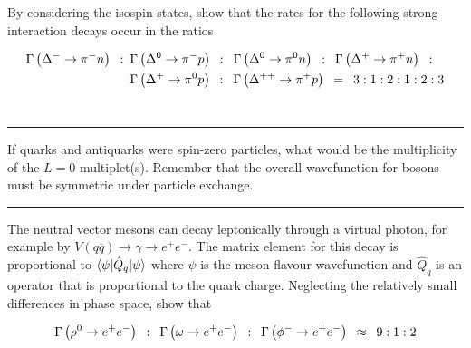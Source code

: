 \begin{problem}{9.3}
By considering the isospin states, show that the rates for the following strong interaction decays occur in the ratios

\begin{align*}
    \Gamma \left( \Delta^- \to \pi^- n \right) \hskip0.5em\relax : \hskip0.5em\relax   &\Gamma \left( \Delta^0 \to \pi^- p \right) \hskip0.5em\relax  : \hskip0.5em\relax   \Gamma \left( \Delta^0 \to \pi^0 n \right) \hskip0.5em\relax : \hskip0.5em\relax   \Gamma \left( \Delta^+ \to \pi^+ n \right) \hskip0.5em\relax : \\
    &\Gamma \left( \Delta^+ \to \pi^0 p \right) \hskip0.5em\relax : \hskip0.5em\relax    \Gamma \left( \Delta^{++} \to \pi^+ p \right) \hskip0.5em\relax =  \hskip0.5em\relax 3:1:2:1:2:3
\end{align*}\\
\end{problem}
\begin{solution}

\end{solution}

\noindent\rule{7in}{1.5pt}


\begin{problem}{9.4}
If quarks and antiquarks were spin-zero particles, what would be the multiplicity of the $L = 0$ multiplet(s). Remember that the overall wavefunction for bosons must be symmetric under particle exchange.
\end{problem}
\begin{solution}

\end{solution}

\noindent\rule{7in}{1.5pt}


\begin{problem}{9.5}
The neutral vector mesons can decay leptonically through a virtual photon, for example by $V(q\overbar{q}) \to \gamma \to e^+e^-$. The matrix element for this decay is proportional to $\braket{\psi|\hat{Q}_q|\psi}$ where $\psi$ is the meson flavour wavefunction and $\hat{Q}_q$ is an operator that is proportional to the quark charge. Neglecting the relatively small differences in phase space, show that

\begin{align*}
    \Gamma \left( \rho^0 \to e^+e^- \right) \hskip0.5em\relax  : \hskip0.5em\relax   \Gamma \left( \omega \to  e^+e^- \right) \hskip0.5em\relax : \hskip0.5em\relax   \Gamma \left( \phi^- \to e^+e^- \right) \hskip0.5em\relax \approx \hskip0.5em\relax 9:1:2
\end{align*}\\
\end{problem}
\begin{solution}

\end{solution}

